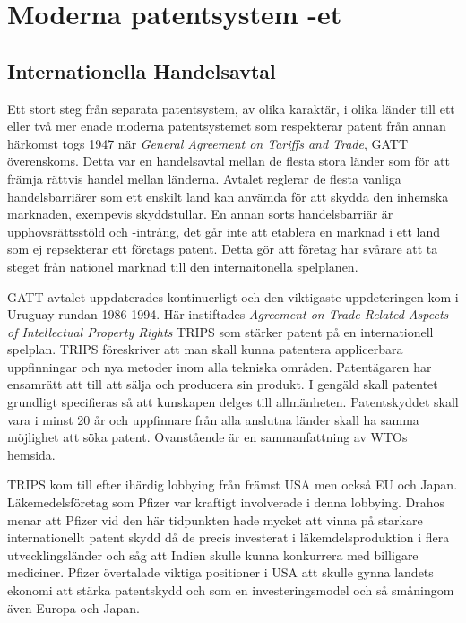 \section{Moderna patentsystem -et}

\subsection{Internationella Handelsavtal}
Ett stort steg från separata patentsystem, av olika karaktär, i olika länder till ett eller två mer enade moderna patentsystemet som respekterar patent från annan härkomst togs 1947 när \emph{General Agreement on Tariffs and Trade}, GATT överenskoms. Detta var en handelsavtal mellan de flesta stora länder som för att främja rättvis handel mellan länderna. \cite{gatt} Avtalet reglerar de flesta vanliga handelsbarriärer som ett enskilt land kan anvämda för att skydda den inhemska marknaden, exempevis skyddstullar. En annan sorts handelsbarriär är upphovsrättsstöld och -intrång, det går inte att etablera en marknad i ett land som ej repsekterar ett företags patent. Detta gör att företag har svårare att ta steget från nationel marknad till den internaitonella spelplanen.

GATT avtalet uppdaterades kontinuerligt och den viktigaste uppdeteringen kom i Uruguay-rundan 1986-1994. Här instiftades \emph{Agreement on Trade Related Aspects of Intellectual Property Rights} TRIPS som stärker patent på en internationell spelplan. TRIPS föreskriver att man skall kunna patentera applicerbara uppfinningar och nya metoder inom alla tekniska områden. Patentägaren har ensamrätt att till att sälja och producera sin produkt. I gengäld skall patentet grundligt specifieras så att kunskapen delges till allmänheten. Patentskyddet skall vara  i minst 20 år och uppfinnare från alla anslutna länder skall ha samma möjlighet att söka patent. Ovanstående är en sammanfattning av WTOs hemsida\cite{wto}.

TRIPS kom till efter ihärdig lobbying från främst USA men också EU och Japan\cite{drahos}. Läkemedelsföretag som Pfizer var kraftigt involverade i denna lobbying\cite{drahos}. Drahos menar att Pfizer vid den här tidpunkten hade mycket att vinna på starkare internationellt patent skydd då de precis investerat i läkemdelsproduktion i flera utvecklingsländer och såg att Indien skulle kunna konkurrera med billigare mediciner\cite{drahos}. Pfizer övertalade viktiga positioner i USA att skulle gynna landets ekonomi att stärka patentskydd och \cite{Intelectual Property} som en investeringsmodel och så småningom även Europa och Japan\cite{drahos}.

